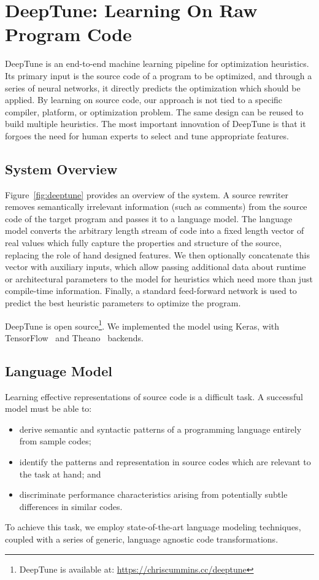 \section{DeepTune: Learning On Raw Program Code} \label{sec:DeepTune}



DeepTune is an end-to-end machine learning pipeline for optimization heuristics.
Its primary input is the source code of a program to be optimized, and through a
series of neural networks, it directly predicts the optimization which should be
applied. By learning on source code, our approach is not tied to a specific
compiler, platform, or optimization problem. The same design can be reused to
build multiple heuristics. The most important innovation of DeepTune is that it
forgoes the need for human experts to select and tune appropriate features.


\subsection{System Overview}

Figure~\ref{fig:deeptune} provides an overview of the system. A source rewriter
removes semantically irrelevant information (such as comments) from the source
code of the target program and passes it to a language model. The language model
converts the arbitrary length stream of code into a fixed length vector of real
values which fully capture the properties and structure of the source, replacing
the role of hand designed features. We then optionally concatenate this vector
with auxiliary inputs, which allow passing additional data about runtime or
architectural parameters to the model for heuristics which need more than just
compile-time information. Finally, a standard feed-forward network is used to
predict the best heuristic parameters to optimize the program.

DeepTune is open source\footnote{DeepTune is available at:
\url{https://chriscummins.cc/deeptune}}. We implemented the model using Keras,
with TensorFlow~\cite{Abadi} and Theano~\cite{Bergstra2011} backends.


\subsection{Language Model}

Learning effective representations of source code is a difficult task. A
successful model must be able to:
%
\begin{itemize}
  \item derive semantic and syntactic patterns of a programming language
  entirely from sample codes;
  \item identify the patterns and representation in source codes which are
  relevant to the task at hand; and
  \item discriminate performance characteristics arising from potentially subtle
  differences in similar codes.
\end{itemize}
%
To achieve this task, we employ state-of-the-art language modeling techniques,
coupled with a series of generic, language agnostic code transformations.

